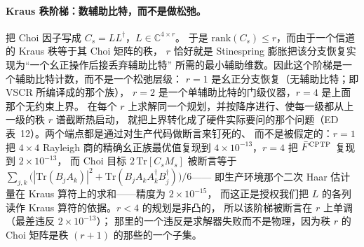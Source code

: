 \documentclass[11pt,a4paper]{article}
\newcommand{\tr}{\mathrm{Tr}}
\begin{document}
\paragraph{Kraus 秩阶梯：数辅助比特，而不是做松弛。}
把 Choi 因子写成 $C_s=LL^\dagger$，$L\in\mathbb C^{4\times r}$。
于是 $\mathrm{rank}(C_s)\le r$，而由于一个信道的 Kraus 秩等于其 Choi 矩阵的秩，
$r$ 恰好就是 Stinespring 膨胀把该分支恢复实现为“一个幺正操作后接丢弃辅助比特”
所需的最小辅助维数。因此这个阶梯是一个辅助比特计数，而不是一个松弛层级：
$r{=}1$ 是幺正分支恢复（无辅助比特；即 VSCR 所编译成的那个族），
$r{=}2$ 是一个单辅助比特的门级仪器，$r{=}4$ 是上面那个无约束上界。
在每个 $r$ 上求解同一个规划，并按降序进行、使每一级都从上一级的秩 $r$ 谱截断热启动，
就把上界转化成了硬件实际要问的那个问题（ED 表~12）。两个端点都是通过对生产代码做断言来钉死的、
而不是被假定的：$r{=}1$ 把 $4\times4$ Rayleigh 商的精确幺正族最优值复现到
$4\times10^{-13}$，$r{=}4$ 把 $\bar F^{\rm CPTP}$ 复现到 $2\times10^{-13}$，
而 Choi 目标 $2\,\mathrm{Tr}[C_sM_s]$ 被断言等于
$\sum_{j,k}\big(|\tr(B_jA_k)|^2+\tr(B_jA_kA_k^\dagger B_j^\dagger)\big)/6$——
即生产环境那个二次 Haar 估计量在 Kraus 算符上的求和——精度为 $2\times10^{-15}$，
而这正是授权我们把 $L$ 的各列读作 Kraus 算符的依据。$r<4$ 的规划是非凸的，
所以该阶梯被断言在 $r$ 上单调（最差违反 $2\times10^{-13}$）；
那里的一个违反是求解器失败而不是物理，因为秩 $r$ 的 Choi 矩阵是秩 $(r{+}1)$
的那些的一个子集。
\end{document}
